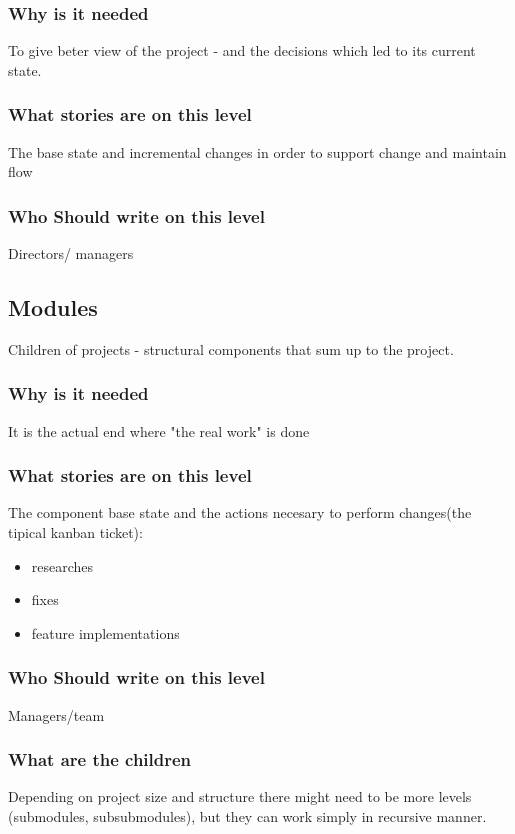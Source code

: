 \subsubsection{Why is it needed}
To give beter view of the project - and the decisions which led to its current state. 
\subsubsection{What stories are on this level}
The base state and incremental changes in order to support change and maintain flow
\subsubsection{Who Should write on this level}
Directors/ managers
\subsection{Modules}
Children of projects - structural components that sum up to the project.
\subsubsection{Why is it needed}
It is the actual end where "the real work" is done
\subsubsection{What stories are on this level}
The component base state and the actions necesary to perform changes(the tipical kanban ticket):
\begin{itemize}
    \item researches
    \item fixes
    \item feature implementations
\end{itemize} 
\subsubsection{Who Should write on this level}
Managers/team
\subsubsection{What are the children}
Depending on project size and structure there might need to be more levels (submodules, subsubmodules), but they can work simply in recursive manner.

